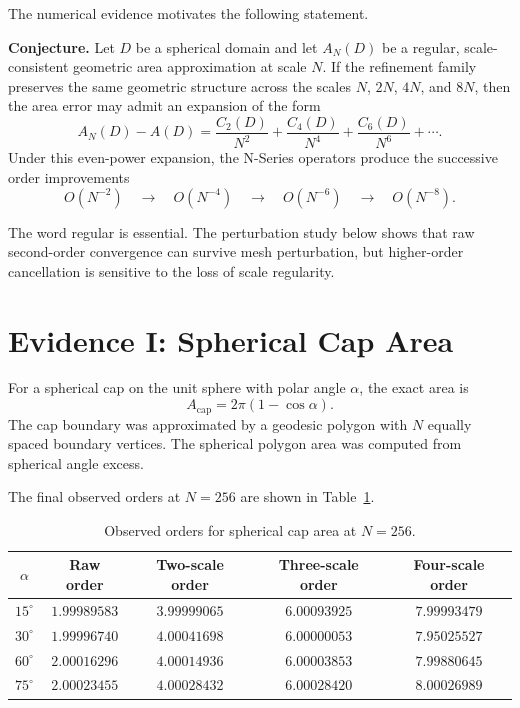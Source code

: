 \documentclass[11pt]{article}
\begin{document}
The numerical evidence motivates the following statement.

\medskip

\noindent
\textbf{Conjecture.}
Let $D$ be a spherical domain and let $A_N(D)$ be a regular,
scale-consistent geometric area approximation at scale $N$.  If the
refinement family preserves the same geometric structure across the scales
$N$, $2N$, $4N$, and $8N$, then the area error may admit an expansion of the
form
\[
  A_N(D)-A(D)
  =
  \frac{C_2(D)}{N^2}
  +
  \frac{C_4(D)}{N^4}
  +
  \frac{C_6(D)}{N^6}
  +
  \cdots .
\]
Under this even-power expansion, the N-Series operators produce the
successive order improvements
\[
  O(N^{-2})
  \quad\longrightarrow\quad
  O(N^{-4})
  \quad\longrightarrow\quad
  O(N^{-6})
  \quad\longrightarrow\quad
  O(N^{-8}).
\]

\medskip

The word regular is essential.  The perturbation study below shows that raw
second-order convergence can survive mesh perturbation, but higher-order
cancellation is sensitive to the loss of scale regularity.

\section{Evidence I: Spherical Cap Area}

For a spherical cap on the unit sphere with polar angle $\alpha$, the exact
area is
\[
  A_{\mathrm{cap}}
  =
  2\pi(1-\cos\alpha).
\]
The cap boundary was approximated by a geodesic polygon with $N$ equally
spaced boundary vertices.  The spherical polygon area was computed from
spherical angle excess.

The final observed orders at $N=256$ are shown in
Table~\ref{tab:cap-orders}.

\begin{table}[ht]
\centering
\small
\begin{tabular}{ccccc}
\toprule
$\alpha$ & Raw order & Two-scale order & Three-scale order & Four-scale order \\
\midrule
$15^\circ$ & $1.99989583$ & $3.99999065$ & $6.00093925$ & $7.99993479$ \\
$30^\circ$ & $1.99996740$ & $4.00041698$ & $6.00000053$ & $7.95025527$ \\
$60^\circ$ & $2.00016296$ & $4.00014936$ & $6.00003853$ & $7.99880645$ \\
$75^\circ$ & $2.00023455$ & $4.00028432$ & $6.00028420$ & $8.00026989$ \\
\bottomrule
\end{tabular}
\caption{Observed orders for spherical cap area at $N=256$.}
\label{tab:cap-orders}
\end{table}
\end{document}
